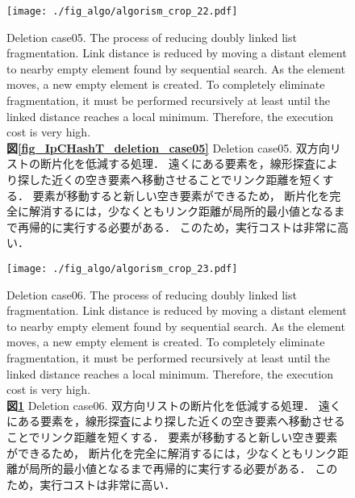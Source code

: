 \begin{figure}[h]
  \texttt{[image: ./fig\_algo/algorism\_crop\_22.pdf]}
  \caption{
    Deletion case05.
    The process of reducing doubly linked list fragmentation.
    Link distance is reduced by moving a distant element to nearby empty element found by sequential search.
    As the element moves, a new empty element is created.
    To completely eliminate fragmentation,
    it must be performed recursively at least until the linked distance reaches a local minimum.
    Therefore, the execution cost is very high.
    \\
    {\bf 図\ref{fig_IpCHashT_deletion_case05}}
    Deletion case05.
    双方向リストの断片化を低減する処理．
    遠くにある要素を，線形探査により探した近くの空き要素へ移動させることでリンク距離を短くする．
    要素が移動すると新しい空き要素ができるため，
    断片化を完全に解消するには，少なくともリンク距離が局所的最小値となるまで再帰的に実行する必要がある．
    このため，実行コストは非常に高い．
  }
  \label{fig_IpCHashT_deletion_case05}

  \texttt{[image: ./fig\_algo/algorism\_crop\_23.pdf]}
  \caption{
    Deletion case06.
    The process of reducing doubly linked list fragmentation.
    Link distance is reduced by moving a distant element to nearby empty element found by sequential search.
    As the element moves, a new empty element is created.
    To completely eliminate fragmentation,
    it must be performed recursively at least until the linked distance reaches a local minimum.
    Therefore, the execution cost is very high.
    \\
    {\bf 図\ref{fig_IpCHashT_deletion_case06}}
    Deletion case06.
    双方向リストの断片化を低減する処理．
    遠くにある要素を，線形探査により探した近くの空き要素へ移動させることでリンク距離を短くする．
    要素が移動すると新しい空き要素ができるため，
    断片化を完全に解消するには，少なくともリンク距離が局所的最小値となるまで再帰的に実行する必要がある．
    このため，実行コストは非常に高い．
  }
  \label{fig_IpCHashT_deletion_case06}
\end{figure}


